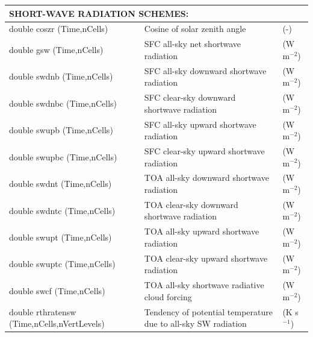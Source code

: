 \documentclass[11pt]{report}
\begin{document}
{\small
\begin{longtable}{|p{2.0in} |p{3.0in} |p{1.0in} |}
\hline
\multicolumn{3}{|l|}{{\rule[-3mm]{0mm}{8mm}\bf SHORT-WAVE RADIATION SCHEMES:} \hfill}\\ \hline
double coszr  (Time,nCells) & Cosine of solar zenith angle & (-) \\ \hline
double gsw (Time,nCells) & SFC all-sky net shortwave radiation & (W m$^{-2}$) \\ \hline
double swdnb (Time,nCells) & SFC all-sky downward shortwave radiation & (W m$^{-2}$) \\ \hline
double swdnbc (Time,nCells) & SFC clear-sky downward shortwave radiation & (W m$^{-2}$) \\ \hline
double swupb (Time,nCells) & SFC all-sky upward shortwave radiation & (W m$^{-2}$) \\ \hline
double swupbc (Time,nCells) & SFC clear-sky upward shortwave radiation & (W m$^{-2}$) \\ \hline
double swdnt (Time,nCells) & TOA all-sky downward shortwave radiation & (W m$^{-2}$) \\ \hline
double swdntc (Time,nCells) & TOA clear-sky downward shortwave radiation & (W m$^{-2}$) \\ \hline
double swupt (Time,nCells) & TOA all-sky upward shortwave radiation & (W m$^{-2}$) \\ \hline
double swuptc (Time,nCells) & TOA clear-sky upward shortwave radiation & (W m$^{-2}$) \\ \hline
double swcf (Time,nCells) & TOA all-sky shortwave radiative cloud forcing & (W m$^{-2}$) \\ \hline
double rthratensw \hfil\break (Time,nCells,nVertLevels) & Tendency of potential temperature due to all-sky SW radiation & (K s$^{-1}$) \\ \hline


\end{longtable}}
\end{document}
